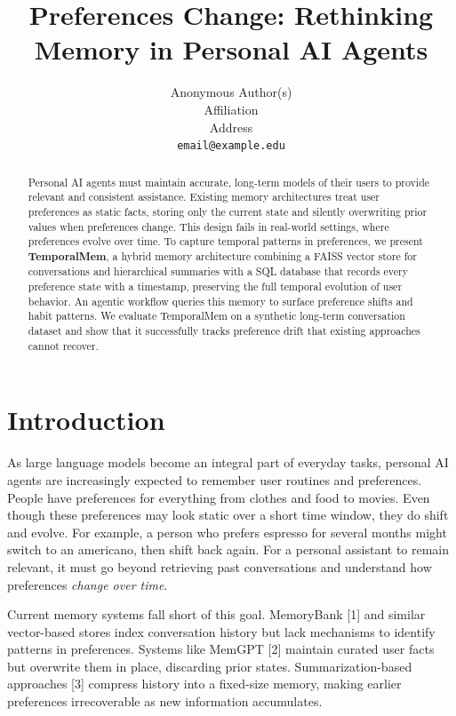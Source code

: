 \documentclass{article}
\title{Preferences Change: Rethinking Memory in Personal AI Agents}
\author{%
  Anonymous Author(s) \\
  Affiliation \\
  Address \\
  \texttt{email@example.edu} \\
}
\begin{document}
\maketitle


\begin{abstract}
Personal AI agents must maintain accurate, long-term models of their users to provide relevant and consistent assistance. Existing memory architectures treat user preferences as static facts, storing only the current state and silently overwriting prior values when preferences change. This design fails in real-world settings, where preferences evolve over time. To capture temporal patterns in preferences, we present \textbf{TemporalMem}, a hybrid memory architecture combining a FAISS vector store for conversations and hierarchical summaries with a SQL database that records every preference state with a timestamp, preserving the full temporal evolution of user behavior. An agentic workflow queries this memory to surface preference shifts and habit patterns. We evaluate TemporalMem on a synthetic long-term conversation dataset and show that it successfully tracks preference drift that existing approaches cannot recover.
\end{abstract}


\section{Introduction}

As large language models become an integral part of everyday tasks, personal AI agents are increasingly expected to remember user routines and preferences. People have preferences for everything from clothes and food to movies. Even though these preferences may look static over a short time window, they do shift and evolve. For example, a person who prefers espresso for several months might switch to an americano, then shift back again. For a personal assistant to remain relevant, it must go beyond retrieving past conversations and understand how preferences \textit{change over time}.

Current memory systems fall short of this goal. MemoryBank [1] and similar vector-based stores index conversation history but lack mechanisms to identify patterns in preferences. Systems like MemGPT [2] maintain curated user facts but overwrite them in place, discarding prior states. Summarization-based approaches [3] compress history into a fixed-size memory, making earlier preferences irrecoverable as new information accumulates.
\end{document}
